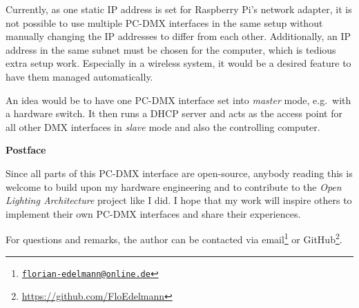 Currently, as one static IP address is set for Raspberry Pi's network
adapter, it is not possible to use multiple PC-DMX interfaces in the
same setup without manually changing the IP addresses to differ from
each other. Additionally, an IP address in the same subnet must be
chosen for the computer, which is tedious extra setup work. Especially
in a wireless system, it would be a desired feature to have them managed
automatically.

An idea would be to have one PC-DMX interface set into \emph{master}
mode, e.g.~with a hardware switch. It then runs a DHCP server and acts
as the access point for all other DMX interfaces in \emph{slave} mode
and also the controlling computer.

\clearpage
\vspace*{2cm}

\begin{center}
    \textbf{Postface}
\end{center}

\vspace*{1cm}

\noindent Since all parts of this PC-DMX interface are open-source,
anybody reading this is welcome to build upon my hardware engineering
and to contribute to the \emph{Open Lighting Architecture} project like
I did. I hope that my work will inspire others to implement their own
PC-DMX interfaces and share their experiences.

For questions and remarks, the author can be contacted via
email\footnote{\href{mailto:florian-edelmann@online.de}{\nolinkurl{florian-edelmann@online.de}}}
or GitHub\footnote{\url{https://github.com/FloEdelmann}}.
